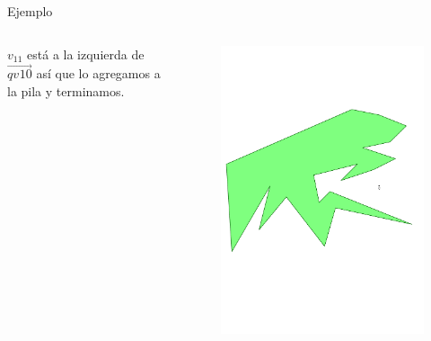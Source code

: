 \documentclass[aspectratio=169,xcolor=dvipsnames, t]{beamer}
\begin{document}
\begin{frame}{Ejemplo}
  \begin{columns}
    \begin{column}{0.3\textwidth}
      \raggedright %
      $v_{11}$ está a la izquierda de $\overrightarrow{qv_{}{10}}$ así que lo agregamos a la pila y terminamos.
    \end{column}
    \begin{column}{0.7\textwidth}
      \vspace{-2.5cm} %
      \begin{figure}
        \centering
        \includegraphics[width=1\linewidth, height=.95\textheight, page=24, keepaspectratio]{IPE/point_visibility.pdf}
      \end{figure}
    \end{column}
  \end{columns}
\end{frame}
\end{document}
